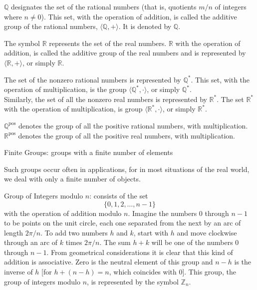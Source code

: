 \documentclass[12pt]{article}
\newcommand{\set}[1]{\{ #1 \}}
\newcommand{\group}[2]{\langle #1, #2 \rangle}
\newcommand{\integers}{\mathds{Z}}
\newcommand{\rationals}{\mathds{Q}}
\newcommand{\nonzerorationals}{\mathds{Q}^*}
\newcommand{\nonzeroreals}{\mathds{R}^*}
\newcommand{\reals}{\mathds{R}}
\begin{document}
 \begin{example} $\rationals$ designates the set of the rational numbers (that is, quotients $m/n$ of integers where $n \neq 0$). This set, with the operation of addition, is called the additive group of the rational numbers, $\group{\rationals}{+}$. It is denoted by $\rationals$. \end{example} 
 
 \begin{example} The symbol $\reals$ represents the set of the real numbers. $\reals$ with the operation of addition, is called the additive group of the real numbers and is represented by $\group{\reals}{+}$, or simply $\reals$. \end{example}
 
 \begin{example} The set of the nonzero rational numbers is represented by $\nonzerorationals$. This set, with the operation of multiplication, is the group $\group{\nonzerorationals}{\cdot}$, or simply $\nonzerorationals$. \\ Similarly, the set of all the nonzero real numbers is represented by $\nonzeroreals$. The set $\nonzeroreals$ with the operation of multiplication, is group $\group{\nonzeroreals}{\cdot}$, or simply $\nonzeroreals$. \end{example} 
 
 \begin{example} $\rationals^{\text{pos}}$ denotes the group of all the positive rational numbers, with multiplication. $\reals^{\text{pos}}$ denotes the group of all the positive real numbers, with multiplication. \end{example} 
 
 \begin{definition} Finite Groups: groups with a finite number of elements \end{definition} Such groups occur often in applications, for in most situations of the real world, we deal with only a finite number of objects. 
 
 \begin{definition} Group of Integers modulo $n$: consists of the set $$\set{0, 1, 2, \dots, n - 1}$$ with the operation of addition modulo $n$. Imagine the numbers 0 through $n - 1$ to be points on the unit circle, each one separated from the next by an arc of length $2\pi / n$. To add two numbers $h$ and $k$, start with $h$ and move clockwise through an arc of $k$ times $2\pi / n$. The sum $h + k$ will be one of the numbers 0 through $n - 1$. From geometrical considerations it is clear that this kind of addition is associative. Zero is the neutral element of this group and $n - h $ is the inverse of $h$ [for $h + (n - h) = n$, which coincides with 0]. This group, the group of integers modulo $n$, is represented by the symbol $\integers_n$. \end{definition} 
 
\end{document}
